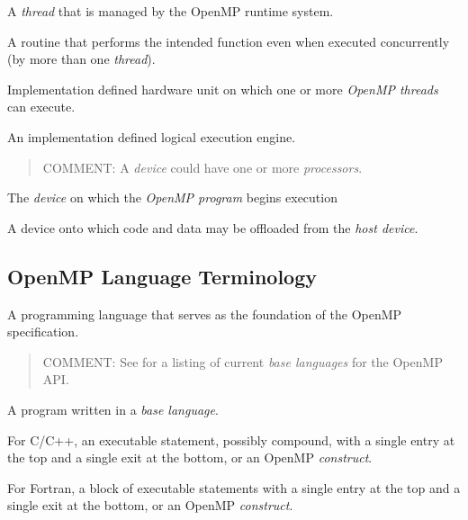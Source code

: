 \glossarydefstart
A \emph{thread} that is managed by the OpenMP runtime system.
\glossarydefend

\glossarydefstart
A routine that performs the intended function even when executed concurrently 
(by more than one \emph{thread}).
\glossarydefend

\glossarydefstart
Implementation defined hardware unit on which one or more \emph{OpenMP threads} can 
execute.
\glossarydefend

\glossarydefstart
An implementation defined logical execution engine.

\begin{quote}
COMMENT: A \emph{device} could have one or more \emph{processors}.
\end{quote}
\glossarydefend

\glossarydefstart
The \emph{device} on which the \emph{OpenMP program} begins execution
\glossarydefend

\glossarydefstart
A device onto which code and data may be offloaded from the \emph{host device}.
\glossarydefend





\subsection{OpenMP Language Terminology}
\label{subsec:OpenMP Language Terminology}
\glossarydefstart
A programming language that serves as the foundation of the OpenMP 
specification.

\begin{quote}
COMMENT: See 
for a listing of current \emph{base languages} for the OpenMP API.
\end{quote}
\glossarydefend

\glossarydefstart
A program written in a \emph{base language}.
\glossarydefend

\glossarydefstart
For C/C++, an executable statement, possibly compound, with a single entry at the 
top and a single exit at the bottom, or an OpenMP \emph{construct}.

For Fortran, a block of executable statements with a single entry at the top and a 
single exit at the bottom, or an OpenMP \emph{construct}.

